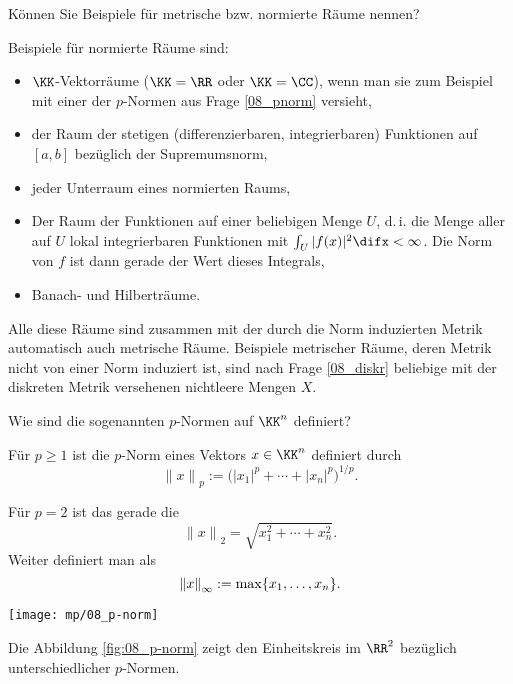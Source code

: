 \begin{frage}
  Können Sie Beispiele für metrische bzw. normierte 
  Räume nennen?
\end{frage} 

\begin{antwort}
  Beispiele für normierte Räume sind: 
  {\setlength{\labelsep}{5mm}
    \begin{itemize}
    \item[\desc{i}] $\KK$-Vektorräume ($\KK=\RR$ oder $\KK=\CC$), wenn man sie 
      zum Beispiel mit einer der $p$-Normen aus Frage \ref{08_pnorm}  
      versieht,
    \item[\desc{ii}] der Raum der stetigen (differenzierbaren, integrierbaren) 
      Funktionen auf $[a,b]$ bezüglich der Supremumsnorm, 
    \item[\desc{iii}] jeder Unterraum eines normierten Raums,
    \item[\desc{iv}] Der Raum der  Funktionen 
      auf einer beliebigen Menge $U$, d.\,i. die Menge aller 
      auf $U$ lokal integrierbaren Funktionen 
      mit $\int_U |f(x)|^2 \difx < \infty$. Die Norm von $f$ ist dann 
      gerade der Wert dieses Integrals, 
    \item[\desc{v}] Banach- und Hilberträume. 
    \end{itemize}}
  \noindent
  Alle diese Räume sind zusammen mit der durch die Norm induzierten Metrik 
  automatisch auch metrische Räume. 
  Beispiele metrischer Räume, deren Metrik nicht von einer Norm induziert ist, 
  sind nach Frage \ref{08_diskr} beliebige mit der diskreten Metrik 
  versehenen nichtleere Mengen $X$.
  \AntEnd
\end{antwort}

\begin{frage}\label{08_pnorm}
  Wie sind die sogenannten $p$-Normen auf $\KK^n$ definiert?
\end{frage}

\begin{antwort}
  Für $p \ge 1$ ist die $p$-Norm eines Vektors $x\in \KK^n$ definiert 
  durch   
  \[
  {\| x \|}_p := \big( {\left| x_1 \right|}^p + \cdots + 
  {\left|x_n \right|}^p \big)^{1/p}.  
  \]

  Für $p=2$ ist das gerade die  
  \[
  {\| x \|}_2 = \sqrt{ x_1^2+\cdots + x_n^2 }.
  \] 
  Weiter definiert man als 
  \begin{equation}
    {\| x \|}_\infty := \max\{ x_1, \ldots, x_n \}.
    \notag
  \end{equation}

  \begin{center}
    \texttt{[image: mp/08\_p-norm]}
    \label{fig:08_p-norm}
  \end{center}

  Die Abbildung \ref{fig:08_p-norm} zeigt den Einheitskreis im $\RR^2$ 
  bezüglich unterschiedlicher $p$-Normen. \AntEnd
\end{antwort}


